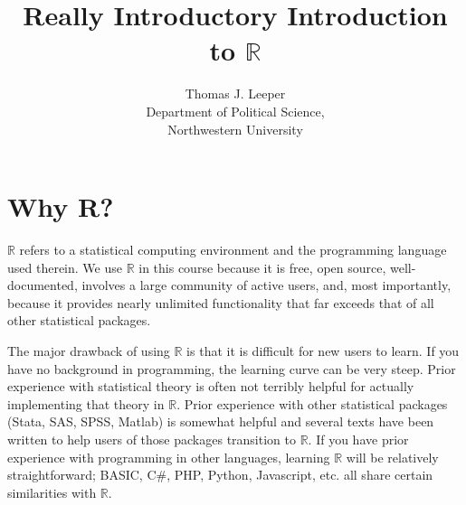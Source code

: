 \documentclass[12pt]{article}
\title{Really Introductory Introduction to $\mathbb{R}$}
\author{Thomas J. Leeper\\
Department of Political Science,\\
Northwestern University}
\begin{document}
\maketitle


\section{Why R?}\label{sec:intro}
$\mathbb{R}$ refers to a statistical computing environment and the programming language used therein. We use $\mathbb{R}$ in this course because it is free, open source, well-documented, involves a large community of active users, and, most importantly, because it provides nearly unlimited functionality that far exceeds that of all other statistical packages.

The major drawback of using $\mathbb{R}$ is that it is difficult for new users to learn. If you have no background in programming, the learning curve can be very steep. Prior experience with statistical theory is often not terribly helpful for actually implementing that theory in $\mathbb{R}$. Prior experience with other statistical packages (Stata, SAS, SPSS, Matlab) is somewhat helpful and several texts have been written to help users of those packages transition to $\mathbb{R}$. If you have prior experience with programming in other languages, learning $\mathbb{R}$ will be relatively straightforward; BASIC, C\#, PHP, Python, Javascript, etc. all share certain similarities with $\mathbb{R}$.
\end{document}

